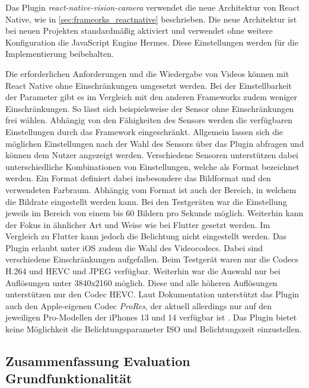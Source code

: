 Das Plugin \textit{react-native-vision-camera} verwendet die neue Architektur von React Native, wie in \autoref{sec:frameorks_reactnative} beschrieben.
Die neue Architektur ist bei neuen Projekten standardmäßig aktiviert und verwendet ohne weitere Konfiguration die JavaScript Engine Hermes.
Diese Einstellungen werden für die Implementierung beibehalten.

Die erforderlichen Anforderungen und die Wiedergabe von Videos können mit React Native ohne Einschränkungen umgesetzt werden.
Bei der Einstellbarkeit der Parameter gibt es im Vergleich mit den anderen Frameworks zudem weniger Einschränkungen.
So lässt sich beispielsweise der Sensor ohne Einschränkungen frei wählen.
Abhängig von den Fähigkeiten des Sensors werden die verfügbaren Einstellungen durch das Framework eingeschränkt.
Allgemein lassen sich die möglichen Einstellungen nach der Wahl des Sensors über das Plugin abfragen und können dem Nutzer angezeigt werden.
Verschiedene Sensoren unterstützen dabei unterschiedliche Kombinationen von Einstellungen, welche als Format bezeichnet werden.
Ein Format definiert dabei insbesondere das Bildformat und den verwendeten Farbraum.
Abhängig vom Format ist auch der Bereich, in welchem die Bildrate eingestellt werden kann.
Bei den Testgeräten war die Einstellung jeweils im Bereich von einem bis 60 Bildern pro Sekunde möglich.
Weiterhin kann der Fokus in ähnlicher Art und Weise wie bei Flutter gesetzt werden.
Im Vergleich zu Flutter kann jedoch die Belichtung nicht eingestellt werden.
Das Plugin erlaubt unter iOS zudem die Wahl des Videocodecs.
Dabei sind verschiedene Einschränkungen aufgefallen.
Beim Testgerät waren nur die Codecs H.264 und \ac{HEVC} und JPEG verfügbar.
Weiterhin war die Auswahl nur bei Auflösungen unter 3840x2160 möglich.
Diese und alle höheren Auflösungen unterstützen nur den Codec \ac{HEVC}.
Laut Dokumentation unterstützt das Plugin auch den Apple-eigenen Codec \textit{ProRes}, der aktuell allerdings nur auf den jeweiligen Pro-Modellen der iPhones 13 und 14 verfügbar ist \cite{Prores_iPhone13}.
Das Plugin bietet keine Möglichkeit die Belichtungsparameter ISO und Belichtungszeit einzustellen.

\subsection{Zusammenfassung Evaluation Grundfunktionalität}

